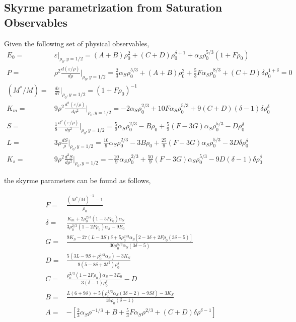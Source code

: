 \documentclass[preprint,prc,preprintnumbers,superscriptaddress,amsmath,amssymb,floatfix]{revtex4-1}
\begin{document}
\subsection{Skyrme parametrization from Saturation Observables}
Given the following set of physical observables,
\begin{equation}
 \begin{split}
  E_0=&\varepsilon\Big|_{\rho_0,y=1/2}=(A+B) \rho_0^2+(C+D) \rho_0^{\delta+1}+\alpha_S \rho_0^{5/3} (1+F \rho_0)\\
  P=&\rho^2\frac{d(\varepsilon/\rho)}{d\rho}\Big|_{\rho_0,y=1/2}=\frac{2}{3} \alpha_S \rho_0^{5/3}+(A+B) \rho_0^2+\frac{5}{3} F \alpha_S \rho_0^{8/3}+(C+D) \delta  \rho_0^{1+\delta }=0\\
  (M^{*}/M)=&\frac{d\varepsilon}{d\tau}\Big|_{\rho_0,y=1/2}=(1+F \rho_0)^{-1}\\
  K_m=&9\rho^2\frac{d^2(\varepsilon/ \rho)}{d\rho^2}\Big|_{\rho_0,y=1/2}=-2 \alpha_S \rho_0^{2/3} + 10 F \alpha_S \rho_0^{5/3} + 9 (C + D) (\delta-1) \delta \rho_0^\delta\\
  S =& \frac{1}{8}\frac{d^2(\varepsilon/ \rho)}{dy^2}\Big|_{\rho_0,y=1/2}=\frac{5}{9} \alpha_S \rho_0^{2/3} - B \rho_0 + \frac{5}{9} (F - 3 G) \alpha_S \rho_0^{5/3} - D \rho_0^\delta\\
  L=& 3\rho \frac{d S}{\rho}\Big|_{\rho_0,y=1/2}=\frac{10}{9} \alpha_S \rho_0^{2/3} - 3 B \rho_0 + \frac{25}{9} (F - 3 G) \alpha_S \rho_0^{5/3} - 3 D \delta \rho_0^\delta\\
  K_s=&9 \rho^2\frac{d^2S}{d\rho^2}\Big|_{\rho_0,y=1/2}=-\frac{10}{9} \alpha_S \rho_0^{2/3} + \frac{50}{9} (F - 3 G) \alpha_S \rho_0^{5/3} - 9 D (\delta-1) \delta \rho_0^\delta
 \end{split}
\end{equation}

the skyrme parameters can be found as follows,

\begin{equation}
 \begin{split}
  F=&\frac{(M^{*}/M)^{-1}-1}{\rho_0}\\
  \delta=&\frac{K_m+2 \rho_0^{2/3}(1-5 F\rho_0)\alpha_S}{3 \rho_0^{2/3}(1-2 F\rho_0)\alpha_S-9 E_0}\\
  G=&\frac{9 K_S-27 (L-3 S) \delta +5 \rho_0^{2/3} \alpha_S [2-3 \delta +2 F \rho_0 (3 \delta-5)]}{30 \rho_0^{5/3} \alpha_S (3 \delta-5)}\\
  D=&\frac{5 (3 L-9 S+\rho_0^{2/3} \alpha_S)-3 K_S}{9(5-8 \delta +3 \delta ^2)\rho_0^{\delta }}\\
  C=&\frac{ \rho_0^{2/3} (1-2 F \rho_0) \alpha_S-3 E_0}{3 (\delta-1)\rho_0^{\delta }}-D\\
  B=&\frac{ L (6+9 \delta )+5 ( \rho_0^{2/3} \alpha_S (3 \delta -2)-9 S \delta)-3 K_S}{18 \rho_0 (\delta-1)}\\
  A=&-[\frac{2}{3} \alpha_S \rho ^{-1/3}+ B  +\frac{5}{3}F \alpha_S \rho ^{2/3}+ (C + D) \delta  \rho ^{\delta-1 }]
 \end{split}
\end{equation}
\end{document}

